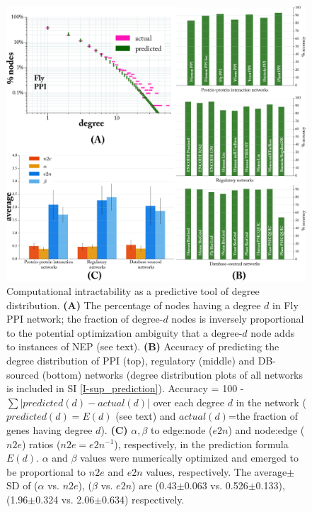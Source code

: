 \documentclass[12pt]{article}
\begin{document}
\begin{figure}[H]%
        \centering
        \includegraphics[width=\textwidth]{Figure8.png}        
        \caption{
            Computational intractability as a predictive tool of degree distribution. \textbf{(A)} The percentage of nodes having a degree $d$ in Fly PPI network; the fraction of degree-$d$ nodes is inversely proportional to the potential optimization ambiguity that a degree-$d$ node adds to instances of NEP (see text). \textbf{(B)} Accuracy of predicting the degree distribution of PPI (top), regulatory (middle) and DB-sourced (bottom) networks (degree distribution plots of all networks is included in SI \ref{I-sup_prediction}).  Accuracy = 100 - $\sum |predicted(d)-actual(d)|$ over each degree $d$ in the network ($predicted(d)=E(d)$ (see text) and $actual(d)$=the fraction of genes having degree $d$). \textbf{(C)} $\alpha, \beta$ to edge:node ($e2n$) and node:edge ($n2e$) ratios ($n2e=e2n^{-1}$), respectively, in the prediction formula $E(d)$. $\alpha$ and $\beta$ values were numerically optimized and emerged to be proportional to $n2e$ and $e2n$ values, respectively. The average$\pm$SD  of ($\alpha$ vs. $n2e$), ($\beta$ vs. $e2n$) are (0.43$\pm$0.063 vs. 0.526$\pm$0.133), (1.96$\pm$0.324 vs. 2.06$\pm$0.634) respectively.}
        \label{predict_figure}
        \label{ambig}
\end{figure}
\end{document}
